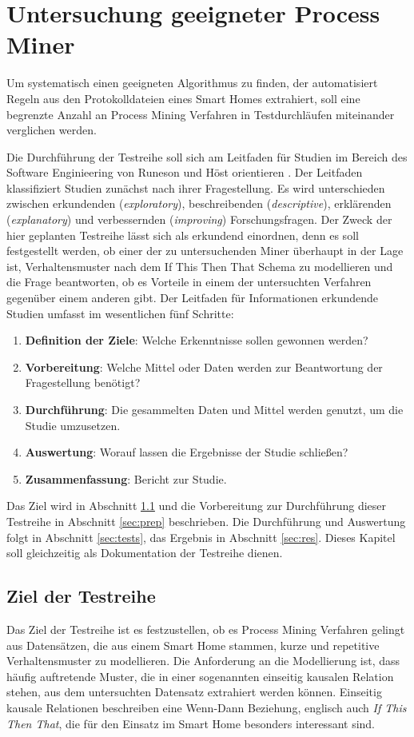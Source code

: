 \chapter{Untersuchung geeigneter Process Miner}\label{chap:approach}
Um systematisch einen geeigneten Algorithmus zu finden, der automatisiert Regeln aus den Protokolldateien eines Smart Homes extrahiert, soll eine begrenzte Anzahl an Process Mining Verfahren in Testdurchläufen miteinander verglichen werden. 

Die Durchführung der Testreihe soll sich am Leitfaden für Studien im Bereich des Software Enginieering von Runeson und Höst orientieren \cite{runh}. Der Leitfaden klassifiziert Studien zunächst nach ihrer Fragestellung. Es wird unterschieden zwischen erkundenden (\textit{exploratory}), beschreibenden (\textit{descriptive}), erklärenden (\textit{explanatory}) und verbessernden (\textit{improving}) Forschungsfragen. Der Zweck der hier geplanten Testreihe lässt sich als erkundend einordnen, denn es soll festgestellt werden, ob einer der zu untersuchenden Miner überhaupt in der Lage ist, Verhaltensmuster nach dem If This Then That Schema zu modellieren und die Frage beantworten, ob es Vorteile in einem der untersuchten Verfahren gegenüber einem anderen gibt. 
Der Leitfaden für Informationen erkundende Studien umfasst im wesentlichen fünf Schritte: 

\begin{enumerate}
  \item \textbf{Definition der Ziele}: Welche Erkenntnisse sollen gewonnen werden?
  \item \textbf{Vorbereitung}: Welche Mittel oder Daten werden zur Beantwortung der Fragestellung benötigt?
  \item \textbf{Durchführung}: Die gesammelten Daten und Mittel werden genutzt, um die Studie umzusetzen. 
  \item \textbf{Auswertung}: Worauf lassen die Ergebnisse der Studie schließen?
  \item \textbf{Zusammenfassung}: Bericht zur Studie.
\end{enumerate}

Das Ziel wird in Abschnitt \ref{sec:def} und die Vorbereitung zur Durchführung dieser Testreihe  in Abschnitt \ref{sec:prep} beschrieben. Die Durchführung und Auswertung folgt in Abschnitt  \ref{sec:tests}, das Ergebnis in Abschnitt \ref{sec:res}. Dieses Kapitel soll gleichzeitig als Dokumentation der Testreihe dienen.

\section{Ziel der Testreihe}\label{sec:def}
Das Ziel der Testreihe ist es festzustellen, ob es Process Mining Verfahren gelingt aus Datensätzen, die aus einem Smart Home stammen, kurze und repetitive Verhaltensmuster zu modellieren. Die Anforderung an die Modellierung ist, dass häufig auftretende Muster, die in einer sogenannten einseitig kausalen Relation stehen, aus dem untersuchten Datensatz extrahiert werden können. Einseitig kausale Relationen beschreiben eine Wenn-Dann Beziehung, englisch auch \textit{If This Then That}, die für den Einsatz im Smart Home besonders interessant sind. 

